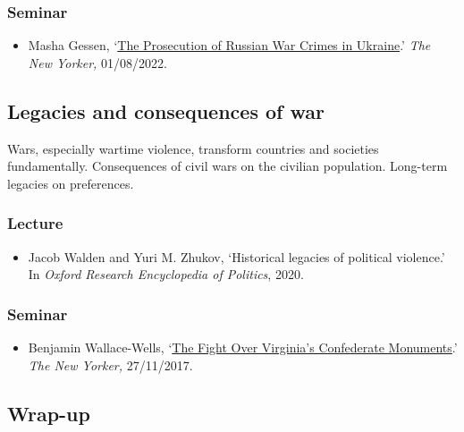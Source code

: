 \documentclass[12pt, a4paper]{article}
\begin{document}
\subsubsection*{Seminar}

\begin{itemize}
\setlength\itemsep{0pt}
\item Masha Gessen, `\href{https://www.newyorker.com/magazine/2022/08/08/the-prosecution-of-russian-war-crimes-in-ukraine}{The Prosecution of Russian War Crimes in Ukraine}.' \textit{The New Yorker,} 01/08/2022.
\end{itemize}

\hline %

\subsection{Legacies and consequences of war}\label{legacies}

Wars, especially wartime violence, transform countries and societies fundamentally. Consequences of civil wars on the civilian population. Long-term legacies on preferences.

\subsubsection*{Lecture}

\begin{itemize}
\setlength\itemsep{0pt}
\item Jacob Walden and Yuri M. Zhukov, `Historical legacies of political violence.' In \textit{Oxford Research Encyclopedia of Politics}, 2020.
\end{itemize}

\subsubsection*{Seminar}

\begin{itemize}
\setlength\itemsep{0pt}
\item Benjamin Wallace-Wells, `\href{https://www.newyorker.com/magazine/2017/12/04/the-fight-over-virginias-confederate-monuments}{The Fight Over Virginia’s Confederate Monuments}.' \textit{The New Yorker,} 27/11/2017.
\end{itemize}


\hline %

\subsection{Wrap-up} \label{wrap_up}
\end{document}
